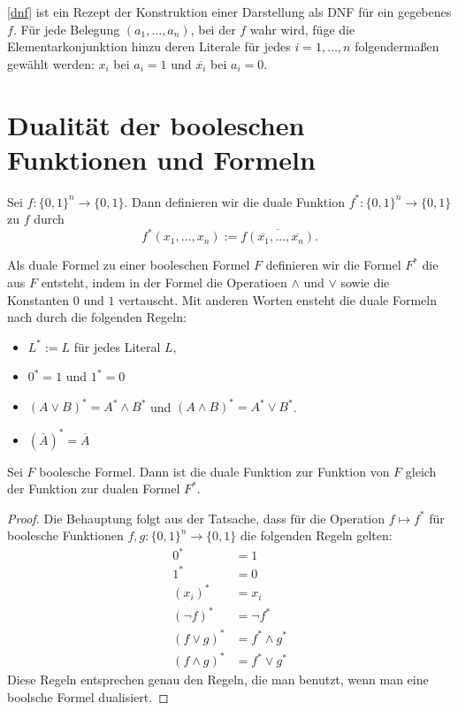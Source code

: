 \begin{bem} \label{dnf:rezept}
	\eqref{dnf} ist ein Rezept der Konstruktion einer Darstellung als DNF für ein gegebenes $f$. Für jede Belegung $(a_1,\ldots,a_n)$, bei der $f$ wahr wird, füge die Elementarkonjunktion hinzu deren Literale für jedes $i=1,\ldots,n$ folgendermaßen  gewählt werden: $x_i$ bei $a_i=1$ und $\overline{x_i}$ bei $a_i=0$. 
\end{bem} 


\section{Dualität der booleschen Funktionen und Formeln} 

\begin{defn}
	Sei $f : \{0,1\}^n \to \{0,1\}$. Dann definieren wir die duale Funktion $f^\ast : \{0,1\}^n \to \{0,1\}$ zu $f$ durch 
	\[
	f^\ast(x_1,\ldots,x_n) := \overline{ f(\overline{x_1},\ldots,\overline{x_n})}. 
	\]
\end{defn} 


\begin{defn}
	Als duale Formel zu einer booleschen Formel $F$ definieren wir die Formel $F^\ast$ die aus $F$ entsteht, indem in der Formel die Operatioen $\wedge$ und $\vee$ sowie die Konstanten $0$ und $1$ vertauscht. Mit anderen Worten ensteht die duale Formeln nach durch die folgenden Regeln:
	\begin{itemize} 
		\item $L^\ast := L$ für jedes Literal $L$, 
		\item $0^\ast = 1$ und $1^\ast = 0$ 
		\item $(A \vee B)^\ast = A^\ast \wedge B^\ast$ und $(A \wedge B)^\ast = A^\ast \vee B^\ast$.
		\item $(\overline{A})^\ast = \overline{A}$
	\end{itemize}  
\end{defn} 

\begin{thm}
	Sei $F$ boolesche Formel. Dann ist die duale Funktion zur Funktion von $F$ gleich der Funktion zur dualen Formel $F^\ast$. 
\end{thm}
\begin{proof} 
	Die Behauptung folgt aus der Tatsache, dass für die Operation $f \mapsto f^\ast$ für boolesche Funktionen $f,g : \{0,1\}^n \to \{0,1\}$ die folgenden Regeln gelten: 
	\begin{align*}
		0^\ast & = 1
		\\ 1^\ast & = 0
		\\ (x_i)^\ast & = x_i
		\\ (\neg{f})^\ast & = \neg{f^\ast}
		\\ (f \vee g)^\ast & = f ^\ast\wedge g^\ast
		\\ (f \wedge g)^\ast & = f ^\ast\vee g^\ast
	\end{align*} 
	Diese Regeln entsprechen genau den Regeln, die man benutzt, wenn man eine boolsche Formel dualisiert. 
\end{proof} 



